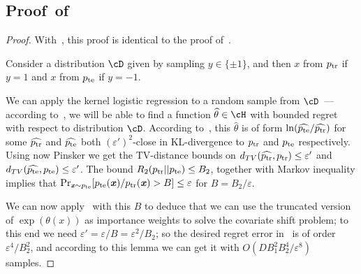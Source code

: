 \subsection{Proof~of~ \label{sec:covariate-shift-kernel-logistic-regression}}
\begin{proof}

With~, this proof is identical to the proof of~.

Consider a distribution $\cD$ given by sampling $y \in \{\pm 1\}$, and then $x$ from $p_{\mathrm{tr}}$ if $y=1$ and $x$ from $p_{\mathrm{te}}$ if $y=-1$.

We can apply the kernel logistic regression to a random sample from $\cD$~--- according to~, we will be able to find a function $\widehat{\theta} \in \cH$ with bounded regret with respect to distribution $\cD$. According to~, this $\widehat{\theta}$ is of form $\ln(\widehat{p_{\mathrm{te}}}/\widehat{p_{\mathrm{tr}}})$ for some $\widehat{p_{\mathrm{tr}}}$ and $\widehat{p_{\mathrm{te}}}$ both $(\varepsilon')^2$-close in KL-divergence to $p_{\mathrm{tr}}$ and $p_{\mathrm{te}}$ respectively. Using now Pinsker we get the TV-distance bounds on $d_{TV}(\widehat{p_{\mathrm{tr}}}, p_{\mathrm{tr}}) \leq \varepsilon'$ and $d_{TV}(\widehat{p_{\mathrm{te}}}, p_{\mathrm{te}}) \leq \varepsilon'$. The bound $R_2(p_{\mathrm{tr}} || p_{\mathrm{te}}) \leq B_2$, together with Markov inequality implies that $\Pr_{\boldsymbol{\mathit{x}} \sim p_{\mathrm{te}}}[p_{\mathrm{te}}(\boldsymbol{\mathit{x}})/p_{\mathrm{tr}}(\boldsymbol{\mathit{x}}) > B] \leq \varepsilon$ for $B = B_2/\varepsilon$. 

We can now apply~ with this $B$ to deduce that we can use the truncated version of $\exp(\theta(x))$ as importance weights to solve the covariate shift problem; to this end we need $\varepsilon' = \varepsilon/B = \varepsilon^2 / B_2$; so the desired regret error in~ is of order~$\varepsilon^4/B_2^2$, and according to this lemma we can get it with $O(D B_1^2 B_2^4 /\varepsilon^8)$ samples.
\end{proof}

